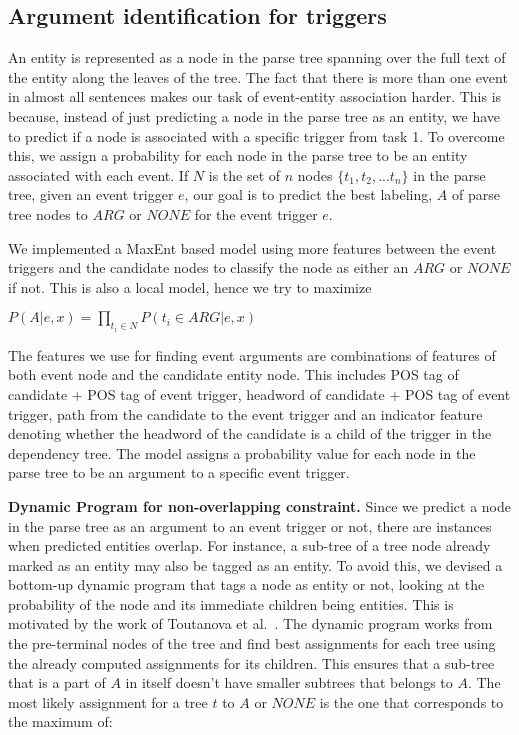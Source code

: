 \subsection{Argument identification for triggers}
An entity is represented as a node in the parse tree spanning over the full text of the entity along the leaves of the tree. The fact that there is more than one event in almost all sentences makes our task of event-entity association harder. This is because, instead of just predicting a node in the parse tree as an entity, we have to predict if a node is associated with a specific trigger from task 1. To overcome this, we assign a probability for each node in the parse tree to be an entity associated with each event. If $N$ is the set of $n$ nodes $\{t_1, t_2, ... t_n\}$ in the parse tree, given an event trigger $e$, our goal is to predict the best labeling, $A$ of parse tree nodes to $ARG$ or $NONE$ for the event trigger $e$.

We implemented a MaxEnt based model using more features between the event triggers and the candidate nodes to classify the node as either an $ARG$ or $NONE$ if not. This is also a local model, hence we try to maximize

$P(A | e, x) = \prod_{t_{i}\in N} P(t_{i} \in ARG | e, x) $

The features we use for finding event arguments are combinations of features of both event node and the candidate entity node. This includes POS tag of candidate + POS tag of event trigger, headword of candidate + POS tag of event trigger, path from the candidate to the event trigger and an indicator feature denoting whether the headword of the candidate is a child of the trigger in the dependency tree. The model assigns a probability value for each node in the parse tree to be an argument to a specific event trigger.

{\bf Dynamic Program for non-overlapping constraint.} Since we predict a node in the parse tree as an argument to an event trigger or not, there are instances when predicted entities overlap. For instance, a sub-tree of a tree node already marked as an entity may also be tagged as an entity. To avoid this, we devised a bottom-up dynamic program that tags a node as entity or not, looking at the probability of the node and its immediate children being entities. This is motivated by the work of Toutanova et al.~. The dynamic program works from the pre-terminal nodes of the tree and find best assignments for each tree using the already computed assignments for its children. This ensures that a sub-tree that is a part of $A$ in itself doesn't have smaller subtrees that belongs to $A$. The most likely assignment for a tree $t$  to $A$ or $NONE$ is the one that corresponds to the maximum of:

